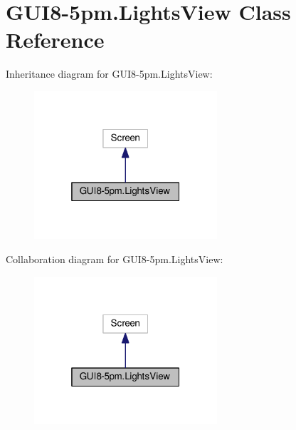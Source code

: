 \hypertarget{classGUI8-5pm_1_1LightsView}{}\section{G\+U\+I8-\/5pm.Lights\+View Class Reference}
\label{classGUI8-5pm_1_1LightsView}


Inheritance diagram for G\+U\+I8-\/5pm.Lights\+View\+:\nopagebreak
\begin{figure}[H]
\begin{center}
\leavevmode
\includegraphics[width=193pt]{classGUI8-5pm_1_1LightsView__inherit__graph}
\end{center}
\end{figure}


Collaboration diagram for G\+U\+I8-\/5pm.Lights\+View\+:\nopagebreak
\begin{figure}[H]
\begin{center}
\leavevmode
\includegraphics[width=193pt]{classGUI8-5pm_1_1LightsView__coll__graph}
\end{center}
\end{figure}
